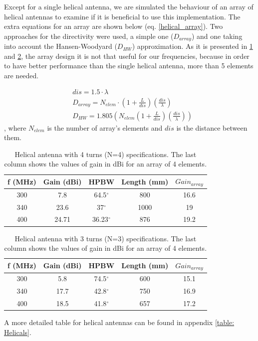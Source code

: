 Except for a single helical antenna, we are simulated the behaviour of an array of helical antennas to examine if it is beneficial to use this implementation. The extra equations for an array are shown below (eq. \ref{helical_array}). Two approaches for the directivity were used, a simple one ($D_{array}$) and one taking into account the Hansen-Woodyard ($D_{HW}$) approximation. As it is presented in \ref{table: Helicals1} and \ref{table: Helicals2}, the array design it is not that useful for our frequencies, because in order to have better performance than the single helical antenna, more than 5 elements are needed.

\begin{subequations}
\begin{align}
    &dis=1.5 \cdot \lambda \\
    &D_{array}=N_{elem} \cdot (1+\frac{L}{dis})(\frac{dis}{\lambda}) \\
    &D_{HW}=1.805(N_{elem}(1+\frac{L}{dis})(\frac{dis}{\lambda})) 
\end{align}
\label{helical_array}
\end{subequations}
, where $N_{elem}$ is the number of array's elements and $dis$ is the distance between them. 

\begin{table}[htb]
\centering
\begin{tabular}{| c | c | c | c | c |}
\hline
 f (MHz) & Gain (dBi) & HPBW & Length (mm) & $Gain_{array}$ \\ 
 \hline
 300 & 7.8 & 64.5$^\circ$ & 800 & 16.6 \\  
 \hline
 340 & 23.6 & 37$^\circ$ & 1000 & 19\\
 \hline
  400 & 24.71 & 36.23$^\circ$ & 876 & 19.2 \\
 \hline
\end{tabular}
\caption{Helical antenna with 4 turns (N=4) specifications. The last column shows the values of gain in dBi for an array of 4 elements.}
\label{table: Helicals1}
\end{table}

\begin{table}[htb]
\centering
\begin{tabular}{| c | c | c | c | c |}
\hline
 f (MHz) & Gain (dBi) & HPBW & Length (mm) & $Gain_{array}$ \\ 
 \hline
 300 & 5.8 & 74.5$^\circ$ & 600 & 15.1 \\  
 \hline
 340 & 17.7 & 42.8$^\circ$ & 750 & 16.9\\
 \hline
  400 & 18.5 & 41.8$^\circ$ & 657 & 17.2 \\
 \hline
\end{tabular}
\caption{Helical antenna with 3 turns (N=3) specifications. The last column shows the values of gain in dBi for an array of 4 elements.}
\label{table: Helicals2}
\end{table}
A more detailed table for helical antennas can be found in appendix \ref{table: Helicals}.


